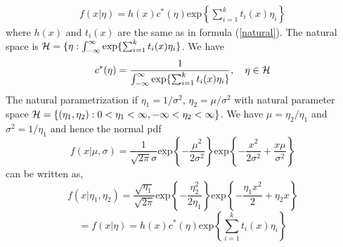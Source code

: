 \begin{align}\label{natural}
    f(x|\eta) = h(x)c^{*}(\eta) \text{exp} \left \{ 
    \sum_{i =1}^{k}t_i(x) \eta_i
    \right \}
\end{align}
where $h(x)$ and $t_i(x)$ are the same as in formula (\ref{natural}). The natural space is $\mathcal H = \{\eta: \int_{-\infty}^{\infty}\text{exp}\{ \sum_{i =1}^{k}t_i(x) \eta_i\}$. We have
$$
c^*(\eta) = \frac{1}{\int_{-\infty}^{\infty}\text{exp}\{ \sum_{i =1}^{k}t_i(x) \eta_i\}}, \quad \eta \in \mathcal H
$$
 The natural parametrization if $\eta_1 = 1/\sigma^2$, $\eta_2 = \mu/\sigma^2$ with natural parameter space $\mathcal H = \{(\eta_1,\eta_2): 0 < \eta_1 < \infty, -\infty < \eta_2 < \infty \}$. We have $\mu = \eta_2/ \eta_1$ and $\sigma^2 = 1/\eta_1$ and hence the normal pdf 
$$
f(x|\mu, \sigma) = \frac{1}{\sqrt{2\pi}\sigma}\text{exp}\left \{ 
-\frac{\mu^2}{2\sigma^2}
\right \}
\text{exp}\left \{ 
-\frac{x^2}{2\sigma^2} + \frac{x \mu}{ \sigma^2}
\right \}
$$
can be written as,
$$
f(x|\eta_1, \eta_2) = \frac{\sqrt{\eta_1}}{\sqrt{2\pi}}
\text{exp}\left \{ 
-\frac{\eta_2^2}{2\eta_1}
\right \}
\text{exp}\left \{ 
-\frac{\eta_1x^2}{2} + \eta_2x
\right \}
$$
$$
= f(x|\eta) = h(x)c^{*}(\eta) \text{exp} \left \{ 
    \sum_{i =1}^{k}t_i(x) \eta_i
    \right \}
$$
